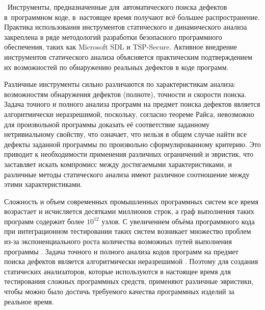 \actuality\
Инструменты, предназначенные для~автоматического поиска дефектов в~программном коде, в~настоящее время получают всё большее распространение. Практика использования инструментов статического и динамического анализа закреплена в ряде методологий разработки безопасного программного обеспечения, таких как Microsoft SDL и TSP-Secure. Активное внедрение инструментов статического анализа объясняется практическим подтверждением их возможностей по обнаружению реальных дефектов в коде программ. 

Различные инструменты сильно различаются по характеристикам анализа: возможностям обнаружения дефектов (полноте), точности и скорости поиска. Задача точного и полного анализа программ на предмет поиска дефектов является алгоритмически неразрешимой, поскольку, согласно теореме Райса, невозможно для произвольной программы доказать её соответствие заданному нетривиальному свойству, что означает, что нельзя в общем случае найти все дефекты заданной программы по произвольно сформулированному критерию. Это приводит к необходимости применения различных ограничений и эвристик, что заставляет искать компромисс между достигаемыми характеристиками, и различные методы статического анализа имеют различное соотношение между этими характеристиками.

Сложность и объем  современных промышленных программных систем все время возрастает и  исчисляется десятками миллионов строк, а граф выполнения таких программ содержит более $10^{12}$ узлов. С увеличением объёма программного кода при интеграционном тестировании таких систем возникает множество проблем из-за экспоненциального роста количества возможных путей выполнения программы  \todo{[ссылка]}. Задача точного и полного анализа кодов программ на предмет поиска дефектов является алгоритмически неразрешимой . Поэтому для создания статических анализаторов, которые используются в настоящее время для тестирования сложных программных средств, применяют различные эвристики, чтобы можно было достичь требуемого качества  программных изделий за реальное время.

